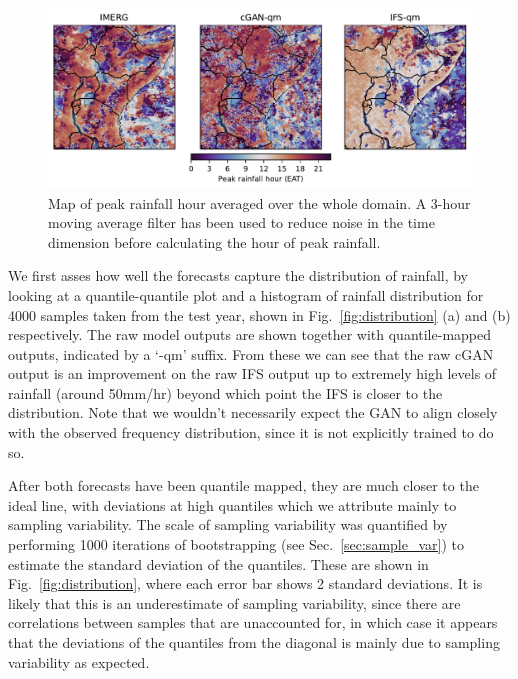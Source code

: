\documentclass[../main.tex]{subfiles}
\begin{document}
\begin{figure}[t]
\centering
\begin{subcaptionblock}{\textwidth}
        \centering
        \includegraphics[width=\textwidth]{images/diurnal_cycle_map_All_final-nologs_217600.pdf}
        \caption{}\label{}
    \end{subcaptionblock}%
    \hfill
     \caption{Map of peak rainfall hour averaged over the whole domain. A 3-hour moving average filter has been used to reduce noise in the time dimension before calculating the hour of peak rainfall.}
     \label{fig:peak_hour}
\end{figure}

 We first asses how well the forecasts capture the distribution of rainfall, by looking at a quantile-quantile plot and a histogram of rainfall distribution for 4000 samples taken from the test year, shown in Fig.~\ref{fig:distribution} (a) and (b) respectively. The raw model outputs are shown together with quantile-mapped outputs, indicated by a `-qm' suffix. From these we can see that the raw cGAN output is an improvement on the raw IFS output up to extremely high levels of rainfall (around 50mm/hr) beyond which point the IFS is closer to the distribution. Note that we wouldn't necessarily expect the GAN to align closely with the observed frequency distribution, since it is not explicitly trained to do so.

After both forecasts have been quantile mapped, they are much closer to the ideal line, with deviations at high quantiles which we attribute mainly to sampling variability. The scale of sampling variability was quantified by performing 1000 iterations of bootstrapping (see Sec.~\ref{sec:sample_var}) to estimate the standard deviation of the quantiles. These are shown in Fig.~\ref{fig:distribution}, where each error bar shows 2 standard deviations. It is likely that this is an underestimate of sampling variability, since there are correlations between samples that are unaccounted for, in which case it appears that the deviations of the quantiles from the diagonal is mainly due to sampling variability as expected. 
\end{document}
